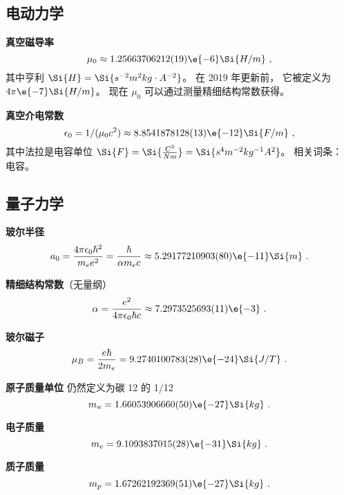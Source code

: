 \subsection{电动力学}

\textbf{真空磁导率}
\begin{equation}
\mu_0 \approx 1.25663706212(19)\e{-6} \Si{H/m}~,
\end{equation}
其中亨利 $\Si{H} = \Si{s^{-2}m^2 kg \cdot A^{-2}}$。 在 2019 年更新前， 它被定义为 $4\pi\e{-7} \Si{H/m}$。 现在 $\mu_0$ 可以通过测量精细结构常数获得。

\textbf{真空介电常数}
\begin{equation}
\epsilon_0 = 1/(\mu_0 c^2) \approx 8.8541878128(13)\e{-12} \Si{F/m}~,
\end{equation}
其中法拉是电容单位 $\Si{F} =\Si{\frac{C^2}{N m}} = \Si{s^4 m^{-2} kg^{-1} A^2}$。 相关词条： 电容。

\subsection{量子力学}
\textbf{玻尔半径}
\begin{equation}
a_0 = \frac{4\pi \epsilon_0 \hbar^2}{m_e e^2} = \frac{\hbar}{\alpha m_e c} \approx 5.29177210903(80)\e{-11}\Si{m}~.
\end{equation}

\textbf{精细结构常数}（无量纲）
\begin{equation}
\alpha = \frac{e^2}{4\pi\epsilon_0\hbar c} \approx 7.2973525693(11)\e{-3}~.
\end{equation}

\textbf{玻尔磁子}
\begin{equation}
\mu_B = \frac{e\hbar}{2m_e} = 9.2740100783(28)\e{-24} \Si{J/T}~.
\end{equation}

\textbf{原子质量单位}
仍然定义为碳 12 的 1/12
\begin{equation}
m_u = 1.66053906660(50)\e{-27} \Si{kg}~.
\end{equation}


\textbf{电子质量}
\begin{equation}\label{eq_Consts_1}
m_e = 9.1093837015(28)\e{-31} \Si{kg}~.
\end{equation}

\textbf{质子质量}
\begin{equation}\label{eq_Consts_2}
m_p = 1.67262192369(51)\e{-27}\Si{kg}~.
\end{equation}


